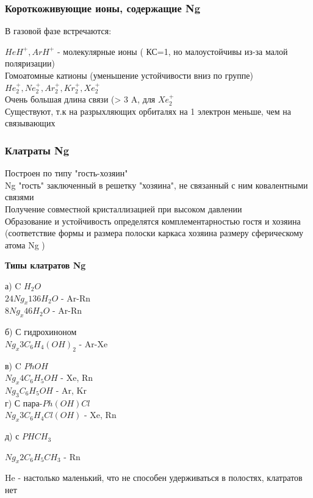 \subsubsection*{Короткоживующие ионы, содержащие Ng}

В газовой фазе встречаются:

$HeH^+, ArH^+$ - молекулярные ионы ( КС=1, но малоустойчивы из-за малой поляризации)\\
Гомоатомные катионы (уменьшение устойчивости вниз по группе)
$He_2^+, Ne_2^+, Ar_2^+, Kr_2^+, Xe_2^+$\\
Очень большая длина связи (> 3 A,  для $Xe_2^+$\\
Существуют, т.к на разрыхляющих орбиталях на 1 электрон меньше, чем на связывающих

\subsubsection*{Клатраты Ng}

Построен по типу "гость-хозяин"\\
Ng "гость" заключенный в решетку "хозяина", не связанный с ним ковалентными связями\\
Получение совместной кристаллизацией при высоком давлении\\
Образование и устойчивость определятся комплементарностью гостя и хозяина (соответствие формы и размера полоски каркаса хозяина размеру сферическому атома Ng )

\textbf{Типы клатратов Ng}

а)  C $H_2O$\\

$24Ng_x136H_2O$ - Ar-Rn\\
$8Ng_x46H_2O$ - Ar-Rn

б)  С гидрохиноном\\

$Ng_x3C_6H_4(OH)_2$ - Ar-Xe

в) C $PhOH$\\

$Ng_x4C_6H_5OH$ - Xe, Rn\\
$Ng_3C_6H_5OH$ -  Ar, Kr\\

г) С пара-$Ph(OH)Cl$\\

$Ng_x3C_6H_4Cl(OH)$ - Xe, Rn

д) с $PHCH_3$

$Ng_x2C_6H_5CH_3$ - Rn

He - настолько маленький, что не способен удерживаться в полостях, клатратов нет

